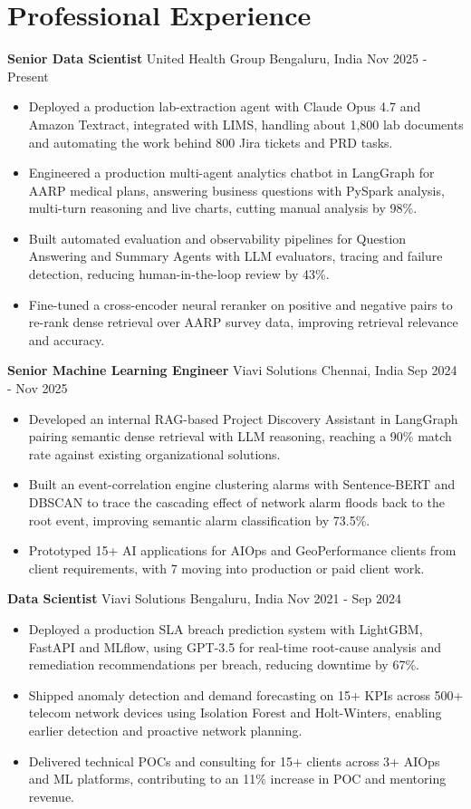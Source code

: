 \documentclass[10pt,a4paper]{article}
\newcommand{\role}[4]{\textbf{#1} \textbar{} #2 \hfill #3 \textbar{} #4\par}
\begin{document}
\section{Professional Experience}
\role{Senior Data Scientist}{United Health Group}{Bengaluru, India}{Nov 2025 - Present}
\begin{itemize}
  \item Deployed a production lab-extraction agent with Claude Opus 4.7 and Amazon Textract, integrated with LIMS, handling about 1,800 lab documents and automating the work behind 800 Jira tickets and PRD tasks.
  \item Engineered a production multi-agent analytics chatbot in LangGraph for AARP medical plans, answering business questions with PySpark analysis, multi-turn reasoning and live charts, cutting manual analysis by 98\%.
  \item Built automated evaluation and observability pipelines for Question Answering and Summary Agents with LLM evaluators, tracing and failure detection, reducing human-in-the-loop review by 43\%.
  \item Fine-tuned a cross-encoder neural reranker on positive and negative pairs to re-rank dense retrieval over AARP survey data, improving retrieval relevance and accuracy.
\end{itemize}
\vspace{3pt}
\role{Senior Machine Learning Engineer}{Viavi Solutions}{Chennai, India}{Sep 2024 - Nov 2025}
\begin{itemize}
  \item Developed an internal RAG-based Project Discovery Assistant in LangGraph pairing semantic dense retrieval with LLM reasoning, reaching a 90\% match rate against existing organizational solutions.
  \item Built an event-correlation engine clustering alarms with Sentence-BERT and DBSCAN to trace the cascading effect of network alarm floods back to the root event, improving semantic alarm classification by 73.5\%.
  \item Prototyped 15+ AI applications for AIOps and GeoPerformance clients from client requirements, with 7 moving into production or paid client work.
\end{itemize}
\vspace{3pt}
\role{Data Scientist}{Viavi Solutions}{Bengaluru, India}{Nov 2021 - Sep 2024}
\begin{itemize}
  \item Deployed a production SLA breach prediction system with LightGBM, FastAPI and MLflow, using GPT-3.5 for real-time root-cause analysis and remediation recommendations per breach, reducing downtime by 67\%.
  \item Shipped anomaly detection and demand forecasting on 15+ KPIs across 500+ telecom network devices using Isolation Forest and Holt-Winters, enabling earlier detection and proactive network planning.
  \item Delivered technical POCs and consulting for 15+ clients across 3+ AIOps and ML platforms, contributing to an 11\% increase in POC and mentoring revenue.
\end{itemize}
\end{document}
